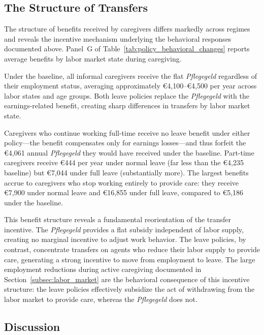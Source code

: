 \subsection{The Structure of Transfers}\label{subsec:benefits}

The structure of benefits received by caregivers differs markedly across regimes and reveals the incentive mechanism underlying the behavioral responses documented above. Panel~G of Table~\ref{tab:policy_behavioral_changes} reports average benefits by labor market state during caregiving.

Under the baseline, all informal caregivers receive the flat \textit{Pflegegeld} regardless of their employment status, averaging approximately \euro{4,100}--\euro{4,500} per year across labor states and age groups. Both leave policies replace the \textit{Pflegegeld} with the earnings-related benefit, creating sharp differences in transfers by labor market state.

Caregivers who continue working full-time receive no leave benefit under either policy---the benefit compensates only for earnings losses---and thus forfeit the \euro{4,061} annual \textit{Pflegegeld} they would have received under the baseline. Part-time caregivers receive \euro{444} per year under normal leave (far less than the \euro{4,235} baseline) but \euro{7,044} under full leave (substantially more). The largest benefits accrue to caregivers who stop working entirely to provide care: they receive \euro{7,900} under normal leave and \euro{16,855} under full leave, compared to \euro{5,186} under the baseline.

This benefit structure reveals a fundamental reorientation of the transfer incentive. The \textit{Pflegegeld} provides a flat subsidy independent of labor supply, creating no marginal incentive to adjust work behavior. The leave policies, by contrast, concentrate transfers on agents who reduce their labor supply to provide care, generating a strong incentive to move from employment to leave. The large employment reductions during active caregiving documented in Section~\ref{subsec:labor_market} are the behavioral consequence of this incentive structure: the leave policies effectively subsidize the act of withdrawing from the labor market to provide care, whereas the \textit{Pflegegeld} does not.


\subsection{Discussion}\label{subsec:discussion}

